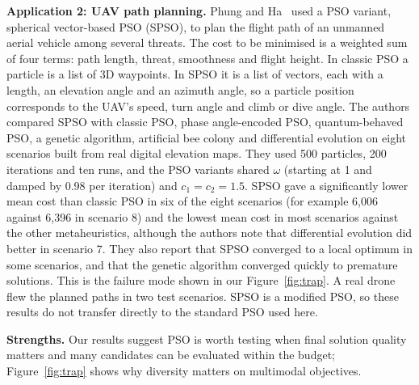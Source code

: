 \documentclass[11pt,a4paper]{article}
\begin{document}
\textbf{Application 2: UAV path planning.} Phung and Ha~\cite{phung2021} used a PSO variant, spherical vector-based PSO (SPSO), to plan the flight path of an unmanned aerial vehicle among several threats. The cost to be minimised is a weighted sum of four terms: path length, threat, smoothness and flight height. In classic PSO a particle is a list of 3D waypoints. In SPSO it is a list of vectors, each with a length, an elevation angle and an azimuth angle, so a particle position corresponds to the UAV's speed, turn angle and climb or dive angle. The authors compared SPSO with classic PSO, phase angle-encoded PSO, quantum-behaved PSO, a genetic algorithm, artificial bee colony and differential evolution on eight scenarios built from real digital elevation maps. They used 500 particles, 200 iterations and ten runs, and the PSO variants shared $\omega$ (starting at 1 and damped by 0.98 per iteration) and $c_1=c_2=1.5$. SPSO gave a significantly lower mean cost than classic PSO in six of the eight scenarios (for example 6,006 against 6,396 in scenario 8) and the lowest mean cost in most scenarios against the other metaheuristics, although the authors note that differential evolution did better in scenario 7. They also report that SPSO converged to a local optimum in some scenarios, and that the genetic algorithm converged quickly to premature solutions. This is the failure mode shown in our Figure~\ref{fig:trap}. A real drone flew the planned paths in two test scenarios. SPSO is a modified PSO, so these results do not transfer directly to the standard PSO used here.

\textbf{Strengths.} Our results suggest PSO is worth testing when final solution quality matters and many candidates can be evaluated within the budget; Figure~\ref{fig:trap} shows why diversity matters on multimodal objectives.
\end{document}
